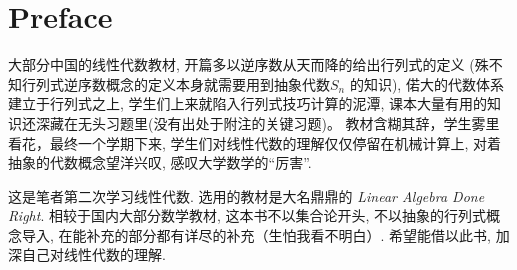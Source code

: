 \chapter{Preface}

大部分中国的线性代数教材, 开篇多以逆序数从天而降的给出行列式的定义
(殊不知行列式逆序数概念的定义本身就需要用到抽象代数\(S_{n}\) 的知识), 偌大的代数体系建立于行列式之上,
学生们上来就陷入行列式技巧计算的泥潭, 课本大量有用的知识还深藏在无头习题里(没有出处于附注的关键习题)。
教材含糊其辞，学生雾里看花，最终一个学期下来,
学生们对线性代数的理解仅仅停留在机械计算上, 对着抽象的代数概念望洋兴叹, 感叹大学数学的``厉害''.

这是笔者第二次学习线性代数. 选用的教材是大名鼎鼎的 \emph{Linear Algebra Done
Right}.
相较于国内大部分数学教材, 这本书不以集合论开头, 不以抽象的行列式概念导入,
在能补充的部分都有详尽的补充（生怕我看不明白）. 希望能借以此书, 加深自己对线性代数的理解.
